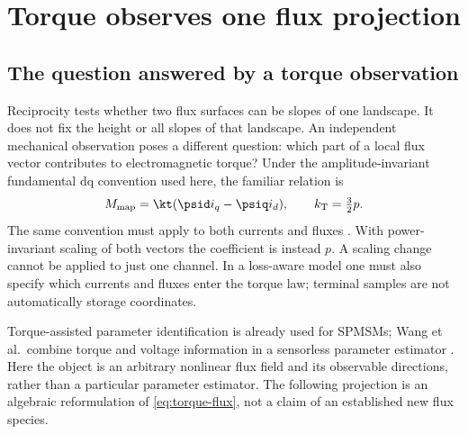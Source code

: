 \section{Torque observes one flux projection}
\label{sec:torque-observability}
\subsection{The question answered by a torque observation}
Reciprocity tests whether two flux surfaces can be slopes of one landscape.
It does not fix the height or all slopes of that landscape. An independent
mechanical observation poses a different question: which part of a local
flux vector contributes to electromagnetic torque? Under the amplitude-invariant
fundamental dq convention used here, the familiar relation is
\begin{equation}
 M_{\rm map}=\kt(\psid i_q-\psiq i_d),\qquad k_{\rm T}=\tfrac32p .
 \label{eq:torque-flux}
\end{equation}
The same convention must apply to both currents and fluxes
\cite{binder2017,schroeder2021,jebai2014}. With power-invariant scaling of
both vectors the coefficient is instead $p$. A scaling change cannot be
applied to just one channel. In a loss-aware model one must also specify
which currents and fluxes enter the torque law; terminal samples are not
automatically storage coordinates.

Torque-assisted parameter identification is already used for SPMSMs;
Wang et al.\ combine torque and voltage information in a sensorless
parameter estimator \cite{wang2026torque}. Here the object is an arbitrary
nonlinear flux field and its observable directions, rather than a particular
parameter estimator. The following projection is an algebraic reformulation
of \cref{eq:torque-flux}, not a claim of an established new flux species.


